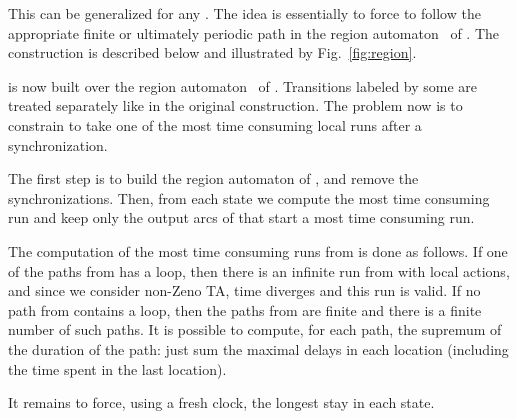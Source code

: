 \documentclass{LMCS}
\theoremstyle{plain}\newtheorem*{prop11}{Proposition~\ref{prop:states} bis}
\begin{document}
This can be generalized for any . The idea is essentially to force
 to follow the appropriate finite or ultimately periodic path in the
region automaton~\cite{AD94} of .
The construction is described below and illustrated by
Fig.~\ref{fig:region}.

 is now built over the region automaton~\cite{AD94}
of . Transitions labeled by some  are treated separately
like in the original construction. The problem now is to constrain 
to take one of the most time consuming local runs after a synchronization.

The first step is to build the region automaton of , and remove the
synchronizations. Then, from each state  we compute the most time consuming
run and keep only the output arcs of  that start a most time consuming run.

The computation of the most time consuming runs from  is done as follows.
If one of the paths from  has a loop, then there is an infinite run from
 with local actions, and since we consider non-Zeno TA, time diverges and
this run is valid.
If no path from  contains a loop, then
the paths from  are finite and there is a finite number of such paths.
It is possible to compute, for each path, the supremum of the duration of the path:
just sum the maximal delays in each location (including the time spent in the
last location).

It remains to force, using a fresh clock, the longest stay in each state.
\end{document}
